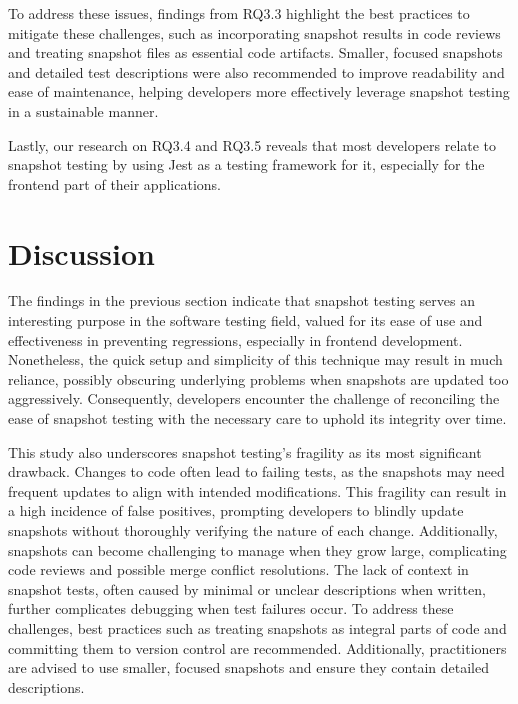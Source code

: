 \documentclass[
	msc, %
	english %
]{../ppgccufmg}
\begin{document}
        To address these issues, findings from RQ3.3 highlight the best practices to mitigate these challenges, such as incorporating snapshot results in code reviews and treating snapshot files as essential code artifacts. Smaller, focused snapshots and detailed test descriptions were also recommended to improve readability and ease of maintenance, helping developers more effectively leverage snapshot testing in a sustainable manner.

        Lastly, our research on RQ3.4 and RQ3.5 reveals that most developers relate to snapshot testing by using Jest as a testing framework for it, especially for the frontend part of their applications.

        \section{Discussion}\label{sec:ch3-discussion}

        The findings in the previous section indicate that snapshot testing serves an interesting purpose in the software testing field, valued for its ease of use and effectiveness in preventing regressions, especially in frontend development. Nonetheless, the quick setup and simplicity of this technique may result in much reliance, possibly obscuring underlying problems when snapshots are updated too aggressively. Consequently, developers encounter the challenge of reconciling the ease of snapshot testing with the necessary care to uphold its integrity over time.

        This study also underscores snapshot testing's fragility as its most significant drawback. Changes to code often lead to failing tests, as the snapshots may need frequent updates to align with intended modifications. This fragility can result in a high incidence of false positives, prompting developers to blindly update snapshots without thoroughly verifying the nature of each change. Additionally, snapshots can become challenging to manage when they grow large, complicating code reviews and possible merge conflict resolutions. The lack of context in snapshot tests, often caused by minimal or unclear descriptions when written, further complicates debugging when test failures occur. To address these challenges, best practices such as treating snapshots as integral parts of code and committing them to version control are recommended. Additionally, practitioners are advised to use smaller, focused snapshots and ensure they contain detailed descriptions.
        
\end{document}
